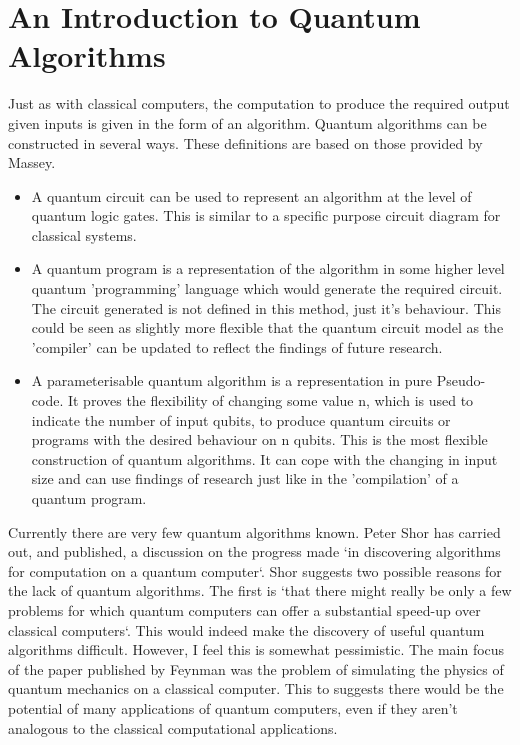 \documentclass[authoryearcitations]{UoYCSproject}
\begin{document}
\section{An Introduction to Quantum Algorithms}

Just as with classical computers, the computation to produce the required output given inputs is given in the form of an algorithm.
Quantum algorithms can be constructed in several ways. These definitions are based on those provided by Massey\cite{masseythesis}.

\begin{itemize}
\item A quantum circuit can be used to represent an algorithm at the level of quantum logic gates.
This is similar to a specific purpose circuit diagram for classical systems.
\item A quantum program is a representation of the algorithm in some higher level quantum 'programming' language which would generate the required circuit.
The circuit generated is not defined in this method, just it's behaviour.
This could be seen as slightly more flexible that the quantum circuit model as the 'compiler' can be updated to reflect the findings of future research.
\item A parameterisable quantum algorithm is a representation in pure Pseudo-code.
It proves the flexibility of changing some value n, which is used to indicate the number of input qubits, to produce quantum circuits or programs with the desired behaviour on n qubits.
This is the most flexible construction of quantum algorithms.
It can cope with the changing in input size and can use findings of research just like in the 'compilation' of a quantum program.
\end{itemize}

Currently there are very few quantum algorithms known.
Peter Shor has carried out, and published, a discussion on the progress made `in discovering algorithms for computation on a quantum computer`\cite{Shor:2004:PQA:1032132.1032149}.
Shor suggests two possible reasons for the lack of quantum algorithms.
The first is `that there might really be only a few problems for which quantum computers can offer a substantial speed-up over classical computers`\cite{Shor:2004:PQA:1032132.1032149}.
This would indeed make the discovery of useful quantum algorithms difficult.
However, I feel this is somewhat pessimistic.
The main focus of the paper published by Feynman\cite{Feynman82simulatingphysics} was the problem of simulating the physics of quantum mechanics on a classical computer.
This to suggests there would be the potential of many applications of quantum computers, even if they aren't analogous to the classical computational applications.
\end{document}
